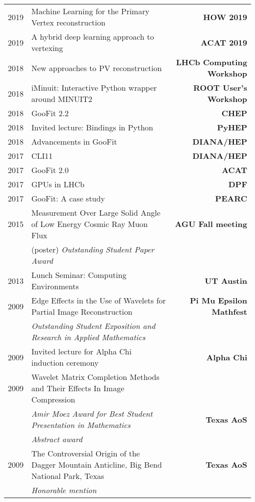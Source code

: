 \documentclass[10pt,letterpaper]{moderncv}
\begin{document}
\begin{tabularx}{\textwidth}{p{.33in}X>{\bfseries}r}
    2019 & Machine Learning for the Primary Vertex reconstruction & HOW 2019 \\ 	
    2019 & A hybrid deep learning approach to vertexing & ACAT 2019 \\ %
	2018 & New approaches to PV reconstruction & LHCb Computing Workshop \\ %
	2018 & iMinuit: Interactive Python wrapper around MINUIT2 & ROOT User's Workshop \\  %
	2018 & GooFit 2.2 & CHEP \\ %
	2018 & Invited lecture: Bindings in Python & PyHEP  \\
    2018 & Advancements in GooFit & DIANA/HEP \\
	2017 & CLI11 & DIANA/HEP \\
	2017 & GooFit 2.0 & ACAT \\
	2017 & GPUs in LHCb & DPF \\ %
	2017 & GooFit: A case study & PEARC \\
	
	
	2015 & Measurement Over Large Solid Angle of Low Energy Cosmic Ray Muon Flux &  AGU Fall meeting \\
	 & (poster) \emph{Outstanding Student Paper Award} & \\
	 2013 & Lunch Seminar: Computing Environments & UT Austin \\
	 2009 & Edge Effects in the Use of Wavelets for Partial Image Reconstruction & Pi Mu Epsilon Mathfest \\
	 & \emph{Outstanding Student Exposition and Research in Applied Mathematics} & \\
	 
	 2009 & Invited lecture for Alpha Chi induction ceremony & Alpha Chi  \\
	 
	 2009 & Wavelet Matrix Completion Methods and Their Effects In Image Compression &  \\
	  & \emph{Amir Moez Award for Best Student Presentation in Mathematics} & Texas AoS \\
	  & \emph{Abstract award} & \\
	  
	  2009 & The Controversial Origin of the Dagger Mountain Anticline, Big Bend National Park, Texas &  Texas AoS \\
	  & \emph{Honorable mention} & \\
	  
	  

\end{tabularx}
\end{document}
